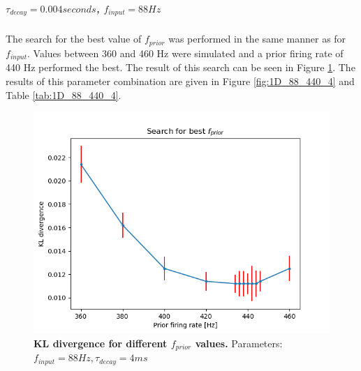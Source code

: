 \subparagraph{$\tau_{decay} = 0.004 seconds$, $f_{input} = 88 Hz$}
The search for the best value of $f_{prior}$ was performed in the same manner as for $f_{input}$. Values between 360 and 460 Hz were simulated and a prior firing rate of 440 Hz performed the best. The result of this search can be seen in Figure \ref{fig:1D_KLD_fInput88_tau4}. The results of this parameter combination are given in Figure \ref{fig:1D_88_440_4} and Table \ref{tab:1D_88_440_4}.

\begin{figure}
  \includegraphics[width=\linewidth]{figures/1D/KLDvsfPrior_fInput88tau4.png}
  \caption{\textbf{KL divergence for different $f_{prior}$ values.} Parameters: $f_{input} = 88 Hz, \tau_{decay} = 4 ms$}
  \label{fig:1D_KLD_fInput88_tau4}
\end{figure}

